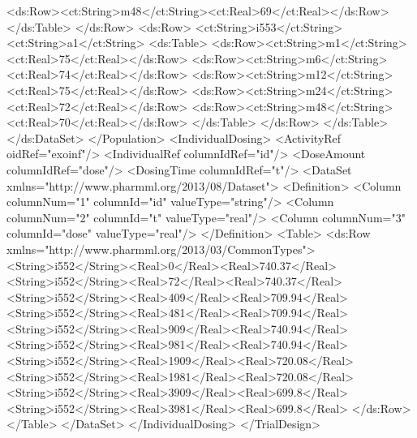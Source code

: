 \documentclass[a4paper,10pt]{article}
\begin{document}
\begin{xmlcode}
                                <ds:Row><ct:String>m48</ct:String><ct:Real>69</ct:Real></ds:Row>
                            </ds:Table>
                    </ds:Row>
                    <ds:Row>
                        <ct:String>i553</ct:String><ct:String>a1</ct:String>
                        <ds:Table>
                            <ds:Row><ct:String>m1</ct:String><ct:Real>75</ct:Real></ds:Row>
                            <ds:Row><ct:String>m6</ct:String><ct:Real>74</ct:Real></ds:Row>
                            <ds:Row><ct:String>m12</ct:String><ct:Real>75</ct:Real></ds:Row>
                            <ds:Row><ct:String>m24</ct:String><ct:Real>72</ct:Real></ds:Row>
                            <ds:Row><ct:String>m48</ct:String><ct:Real>70</ct:Real></ds:Row>
                        </ds:Table>
                    </ds:Row>
                </ds:Table>
            </ds:DataSet>
        </Population>
        <IndividualDosing>
                <ActivityRef oidRef="exoinf"/>
                <IndividualRef columnIdRef="id"/>
                <DoseAmount columnIdRef="dose"/>
                <DosingTime columnIdRef="t"/>
                <DataSet xmlns="http://www.pharmml.org/2013/08/Dataset">
                    <Definition>
                        <Column columnNum="1" columnId="id" valueType="string"/>
                        <Column columnNum="2" columnId="t" valueType="real"/>
                        <Column columnNum="3" columnId="dose" valueType="real"/>
                    </Definition>
                    <Table>
                        <ds:Row xmlns="http://www.pharmml.org/2013/03/CommonTypes">
                            <String>i552</String><Real>0</Real><Real>740.37</Real>
                            <String>i552</String><Real>72</Real><Real>740.37</Real>
                            <String>i552</String><Real>409</Real><Real>709.94</Real>
                            <String>i552</String><Real>481</Real><Real>709.94</Real>
                            <String>i552</String><Real>909</Real><Real>740.94</Real>
                            <String>i552</String><Real>981</Real><Real>740.94</Real>
                            <String>i552</String><Real>1909</Real><Real>720.08</Real>
                            <String>i552</String><Real>1981</Real><Real>720.08</Real>
                            <String>i552</String><Real>3909</Real><Real>699.8</Real>
                            <String>i552</String><Real>3981</Real><Real>699.8</Real>
                        </ds:Row>
                    </Table>
                </DataSet>
        </IndividualDosing>
    </TrialDesign>
\end{xmlcode}
\end{document}
